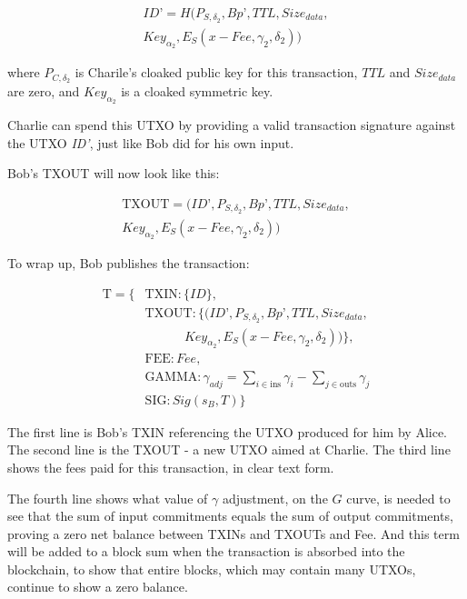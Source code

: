 \documentclass[8pt,fleqn,openany]{book}
\begin{document}
{\begin{multline*}
ID’ = H(P_{S, \delta_2}, Bp’, TTL, Size_{data}, \\
          Key_{\alpha_2}, E_S(x - Fee, \gamma_2, \delta_2))
\end{multline*}

where $P_{C, \delta_2}$ is Charile’s cloaked public key for this transaction, $TTL$ and $Size_{data}$ are zero, and $Key_{\alpha_2}$ is a cloaked symmetric key. 

Charlie can spend this UTXO by providing a valid transaction signature against the UTXO \textit{ID’}, just like Bob did for his own input. 

Bob’s TXOUT will now look like this:

\begin{multline*}
\text{TXOUT} = (ID’, P_{S, \delta_2}, Bp’, TTL, Size_{data},\\ 
                Key_{\alpha_2}, E_S(x - Fee, \gamma_2, \delta_2))
\end{multline*}

To wrap up, Bob publishes the transaction:

\begin{align*}
\text{T} = \{&\text{TXIN} : \{\mathit{ID}\}, \\
 &\text{TXOUT} : \{(ID’, P_{S, \delta_2}, Bp’, TTL, Size_{data}, \\
 & \ \ \ \ \ \ \ \ \ \ \ \ \ \ Key_{\alpha_2}, E_S(x - Fee, \gamma_2, \delta_2))\}, \\
 &\text{FEE} : \mathit{Fee}, \\
 &\text{GAMMA} : \gamma_{\mathit{adj}} = \sum_{i \in \text{ins}}{\gamma_i} - \sum_{j \in \text{outs}}{\gamma_j}\\
 &\text{SIG} : \mathit{Sig}(s_B, T)\}
\end{align*}

The first line is Bob’s TXIN referencing the UTXO produced for him by Alice. The second line is the TXOUT - a new UTXO aimed at Charlie. The third line shows the fees paid for this transaction, in clear text form. 

The fourth line shows what value of $\gamma$ adjustment, on the $G$ curve, is needed to see that the sum of input commitments equals the sum of output commitments, proving a zero net balance between TXINs and TXOUTs and Fee. And this term will be added to a block sum when the transaction is absorbed into the blockchain, to show that entire blocks, which may contain many UTXOs, continue to show a zero balance.

}
\end{document}
